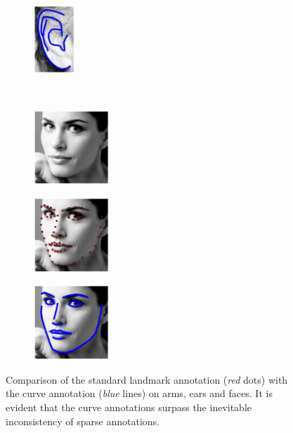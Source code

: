 \begin{figure}[t!]
\begin{subfigure}[b]{0.085\textwidth}
    \end{subfigure}
    \hfill
    \begin{subfigure}[b]{0.085\textwidth}
            \includegraphics[height=2.55cm]{resources/Fig_Intro/intro_1_2}
    \end{subfigure}
    \\
    \begin{subfigure}[b]{0.156\textwidth}
            \includegraphics[height=2.8cm]{resources/Fig_Intro/intro_0_0}
    \end{subfigure}
    \hfill
    \begin{subfigure}[b]{0.156\textwidth}
            \includegraphics[height=2.8cm]{resources/Fig_Intro/intro_0_1}
    \end{subfigure}
  	\hfill
    \begin{subfigure}[b]{0.156\textwidth}
            \includegraphics[height=2.8cm]{resources/Fig_Intro/intro_0_2}
    \end{subfigure}
    \caption{Comparison of the standard landmark annotation (\emph{red} dots) with the curve annotation (\emph{blue} lines) on arms, ears and faces. It is evident that the curve annotations surpass the inevitable inconsistency of sparse annotations.}
    \label{fig:intro}
\end{figure}


